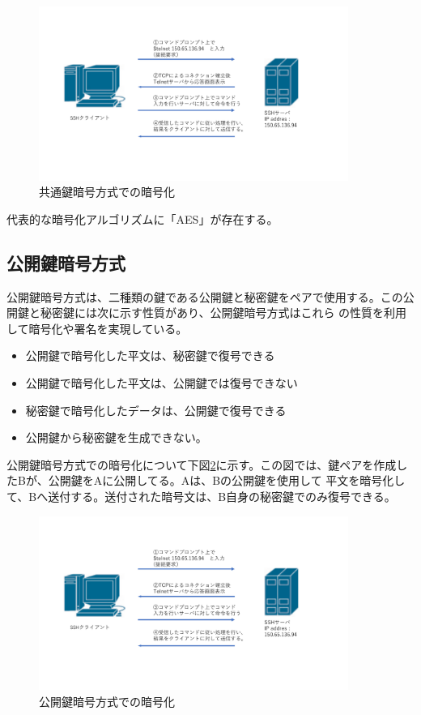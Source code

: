 \documentclass[12pt,a4paper,titlepage]{jreport}
\begin{document}
\begin{figure}[h]
    \centering
    \includegraphics[width=0.9\textwidth, page=8]{graphs/network_archtecture.pdf}
    \caption{共通鍵暗号方式での暗号化}
    \label{shared_key}
\end{figure}

代表的な暗号化アルゴリズムに「AES」が存在する。
\subsection{公開鍵暗号方式}
公開鍵暗号方式は、二種類の鍵である公開鍵と秘密鍵をペアで使用する。この公開鍵と秘密鍵には次に示す性質があり、公開鍵暗号方式はこれら
の性質を利用して暗号化や署名を実現している。
\begin{itemize}
    \item 公開鍵で暗号化した平文は、秘密鍵で復号できる
    \item 公開鍵で暗号化した平文は、公開鍵では復号できない
    \item 秘密鍵で暗号化したデータは、公開鍵で復号できる
    \item 公開鍵から秘密鍵を生成できない。
\end{itemize}

公開鍵暗号方式での暗号化について下図\ref{public_key}に示す。この図では、鍵ペアを作成したBが、公開鍵をAに公開してる。Aは、Bの公開鍵を使用して
平文を暗号化して、Bへ送付する。送付された暗号文は、B自身の秘密鍵でのみ復号できる。

\begin{figure}[h]
    \centering
    \includegraphics[width=0.9\textwidth, page=9]{graphs/network_archtecture.pdf}
    \caption{公開鍵暗号方式での暗号化}
    \label{public_key}
\end{figure}
\end{document}
